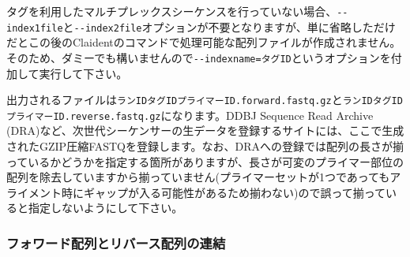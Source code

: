 \documentclass[titlepage,10pt,a4paper]{jsbook}
\begin{document}
タグを利用したマルチプレックスシーケンスを行っていない場合、\texttt{{-}{-}index1file}と\texttt{{-}{-}index2file}オプションが不要となりますが、単に省略しただけだとこの後のClaidentのコマンドで処理可能な配列ファイルが作成されません。そのため、ダミーでも構いませんので\texttt{{-}{-}indexname=タグID}というオプションを付加して実行して下さい。

出力されるファイルは\texttt{ランID{\textunderscore}{\textunderscore}タグID{\textunderscore}{\textunderscore}プライマーID.forward.fastq.gz}と\texttt{ランID{\textunderscore}{\textunderscore}タグID{\textunderscore}{\textunderscore}プライマーID.reverse.fastq.gz}になります。DDBJ Sequence Read Archive (DRA)など、次世代シーケンサーの生データを登録するサイトには、ここで生成されたGZIP圧縮FASTQを登録します。なお、DRAへの登録では配列の長さが揃っているかどうかを指定する箇所がありますが、長さが可変のプライマー部位の配列を除去していますから揃っていません(プライマーセットが1つであってもアライメント時にギャップが入る可能性があるため揃わない)ので誤って揃っていると指定しないようにして下さい。

\subsubsection{フォワード配列とリバース配列の連結}
\end{document}
